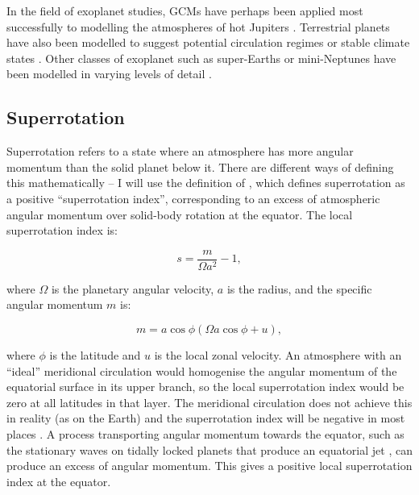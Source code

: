In the field of exoplanet studies, GCMs have perhaps been applied most successfully to modelling the atmospheres of hot Jupiters \citep{showman2002atmospheric, mayne2014unified, parmentier2016transitions, amundsen2016hd209, mayne2017hotjupiter}. Terrestrial planets have also been modelled to suggest potential circulation regimes or stable climate states \citep{merlis2010atmospheric, showman2012review, boutle2017proxima, noda2017circulation}. Other classes of exoplanet such as super-Earths or mini-Neptunes have been modelled in varying levels of detail \citep{carone2015regimes, charnay20153d, heng2015review}.


\subsection{Superrotation}\label{sec:superrotation}

Superrotation refers to a state where an atmosphere has more angular momentum than the solid planet below it. There are different ways of defining this mathematically -- I will use the definition of \citet{read1986super}, which defines superrotation as a positive ``superrotation index'', corresponding to an excess of atmospheric angular momentum over solid-body rotation at the equator. The local superrotation index is:

\begin{equation}
  s=\frac{m}{\Omega a^{2}}-1,
\end{equation}

where $\Omega$ is the planetary angular velocity, $a$ is the radius, and the specific angular momentum $m$ is:

\begin{equation}
 m=a \cos \phi(\Omega a \cos \phi+u),
\end{equation}

where $\phi$ is the latitude and $u$ is the local zonal velocity. An atmosphere with an ``ideal'' meridional circulation would homogenise the angular momentum of the equatorial surface in its upper branch, so the local superrotation index would be zero at all latitudes in that layer. The meridional circulation does not achieve this in reality (as on the Earth) and the superrotation index will be negative in most places \citep{read2018superrotation}. A process transporting angular momentum towards the equator, such as the stationary waves on tidally locked planets that produce an equatorial jet \citep{showman2011superrotation}, can produce an excess of angular momentum. This gives a positive local superrotation index at the equator.

